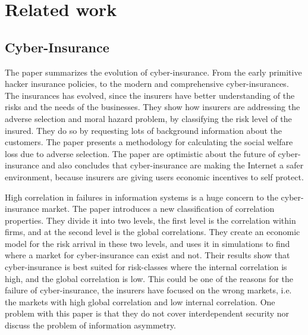 \chapter{Related work}
\label{chp:relatedwork} 



\section{Cyber-Insurance}

The paper \cite{majuca2006evolution} summarizes the evolution of cyber-insurance. From the early primitive hacker insurance policies, to the modern and comprehensive cyber-insurances. The insurances has evolved, since the insurers have better understanding of the risks and the needs of the businesses. They show how insurers are addressing the adverse selection and moral hazard problem, by classifying the risk level of the insured. They do so by requesting lots of background information about the customers. The paper presents a methodology for calculating the social welfare loss due to adverse selection. The paper are optimistic about the future of cyber-insurance and also concludes that cyber-insurance are making the Internet a safer environment, because insurers are giving users economic incentives to self protect. 

High correlation in failures in information systems is a huge concern to the cyber-insurance market. The paper \cite{bohme2006models} introduces a new classification of correlation properties. They divide it into two levels, the first level is the correlation within firms, and at the second level is the global correlations. They create an economic model for the risk arrival in these two levels, and uses it in simulations to find where a market for cyber-insurance can exist and not. Their results show that cyber-insurance is best suited for risk-classes where the internal correlation is high, and the global correlation is low. This could be one of the reasons for the failure of cyber-insurance, the insurers have focused on the wrong markets, i.e. the markets with high global correlation and low internal correlation. One problem with this paper is that they do not cover interdependent security nor discuss the problem of information asymmetry.  

